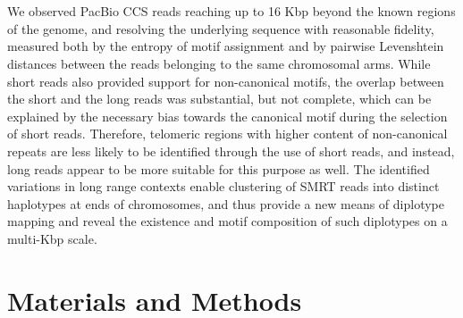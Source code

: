 \documentclass{article}
\begin{document}
\\~\\
We observed PacBio CCS reads reaching up to 16 Kbp beyond the known regions of the genome, and resolving the underlying sequence with reasonable fidelity, measured both by the entropy of motif assignment and by pairwise Levenshtein distances between the reads belonging to the same chromosomal arms.
While short reads also provided support for non-canonical motifs, the overlap between the short and the long reads was substantial, but not complete, which can be explained by the necessary bias towards the canonical motif during the selection of short reads.
Therefore, telomeric regions with higher content of non-canonical repeats are less likely to be identified through the use of short reads, and instead, long reads appear to be more suitable for this purpose as well. %
The identified variations in long range contexts enable clustering of SMRT reads into distinct haplotypes at ends of chromosomes, and thus provide a new means of diplotype mapping and reveal the existence and motif composition of such diplotypes on a multi-Kbp scale.

\section*{Materials and Methods}  \label{sec:methods}
\end{document}
